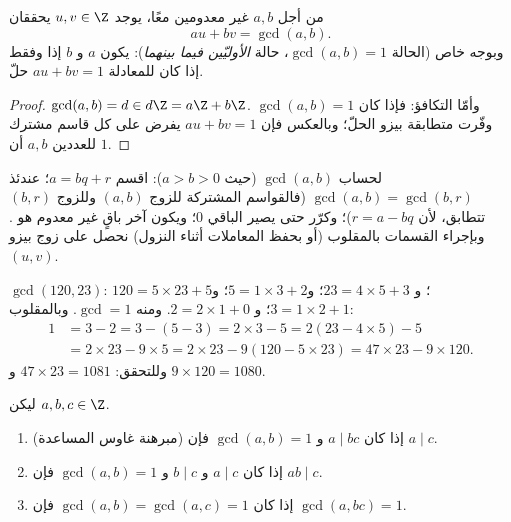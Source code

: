 \begin{corollary}\label{cor:b1:arith:bezout}
من أجل $a, b$ غير معدومين معًا، يوجد $u, v \in \Z$ يحققان
\[
au + bv = \gcd(a, b) .
\]
وبوجه خاص (الحالة $\gcd(a,b) = 1$، حالة \emph{الأوليّين فيما
بينهما}): يكون $a$ و $b$  إذا وفقط إذا كان للمعادلة $au + bv = 1$ حلّ.
\end{corollary}

\begin{proof}
$\gcd(a,b) = d \in d\Z = a\Z + b\Z$. وأمّا التكافؤ: فإذا كان
$\gcd(a,b) = 1$ وفّرت متطابقة بيزو الحلّ؛ وبالعكس فإن $au + bv =
1$ يفرض على كل قاسم مشترك للعددين $a, b$ أن  $1$.
\end{proof}

\begin{method}\label{met:b1:arith:euclid}
لحساب $\gcd(a, b)$ (حيث $a > b > 0$): اقسم $a = bq + r$؛ عندئذ
$\gcd(a, b) = \gcd(b, r)$ (فالقواسم المشتركة للزوج $(a,b)$ وللزوج $(b,r)$ تتطابق، لأن $r = a - bq$)؛ وكرّر حتى يصير الباقي $0$؛ ويكون
آخر باقٍ غير معدوم هو . وبإجراء
القسمات بالمقلوب (أو بحفظ المعاملات أثناء
النزول) نحصل على زوج بيزو $(u, v)$.
\end{method}

\begin{example}\label{ex:b1:arith:euclid}
$\gcd(120, 23)$: $120 = 5 \times 23 + 5$؛ و $23 = 4 \times 5 + 3$؛ و$5 =
1\times 3 + 2$؛ و $3 = 1 \times 2 + 1$؛ و $2 = 2 \times 1 + 0$. ومنه
$\gcd = 1$. وبالمقلوب:
\begin{align*}
1 &= 3 - 2 = 3 - (5 - 3) = 2\times 3 - 5 = 2(23 - 4\times 5) - 5 \\
&= 2 \times 23 - 9 \times 5 = 2\times 23 - 9(120 - 5\times 23)
= 47 \times 23 - 9 \times 120 .
\end{align*}
وللتحقق: $47 \times 23 = 1081$ و $9 \times 120 = 1080$.
\end{example}

\begin{theorem}\label{thm:b1:arith:gauss}
ليكن $a, b, c \in \Z$.
\begin{enumerate}
  \item (مبرهنة غاوس المساعدة) إذا كان $a \mid bc$ و
        $\gcd(a, b) = 1$ فإن $a \mid c$.
  \item إذا كان $a \mid c$ و $b \mid c$ و $\gcd(a,b) = 1$ فإن $ab \mid
        c$.
  \item إذا كان $\gcd(a, b) = \gcd(a, c) = 1$ فإن $\gcd(a, bc) = 1$.
\end{enumerate}
\end{theorem}

